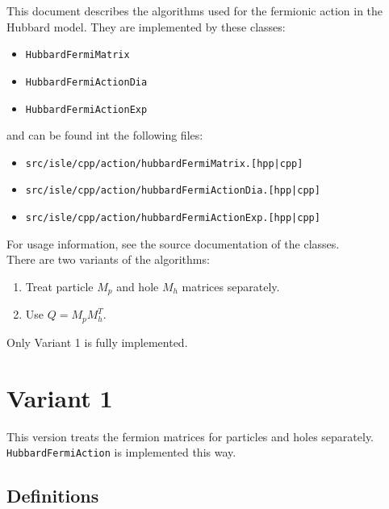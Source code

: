 \documentclass[a4paper, fleqn, twoside, notitlepage]{scrartcl}
\begin{document}
\maketitle
\vspace{-3em}
\tableofcontents

\vfill
\vspace{1em}
\noindent
This document describes the algorithms used for the fermionic action in the Hubbard model.
They are implemented by these classes:
\begin{itemize}
\item \texttt{HubbardFermiMatrix}
\item \texttt{HubbardFermiActionDia}
\item \texttt{HubbardFermiActionExp}
\end{itemize}
and can be found int the following files:
\begin{itemize}
\item \texttt{src/isle/cpp/action/hubbardFermiMatrix.[hpp|cpp]}
\item \texttt{src/isle/cpp/action/hubbardFermiActionDia.[hpp|cpp]}
\item \texttt{src/isle/cpp/action/hubbardFermiActionExp.[hpp|cpp]}
\end{itemize}
For usage information, see the source documentation of the classes.\\

\noindent
There are two variants of the algorithms:
\begin{enumerate}
\item Treat particle $M_p$ and hole $M_h$ matrices separately.
\item Use $Q = M_p M_h^T$.
\end{enumerate}
Only Variant 1 is fully implemented.

\clearpage
\section{Variant 1}\label{sec:variant1}

This version treats the fermion matrices for particles and holes separately.
\texttt{HubbardFermiAction} is implemented this way.

\subsection{Definitions}
\end{document}
